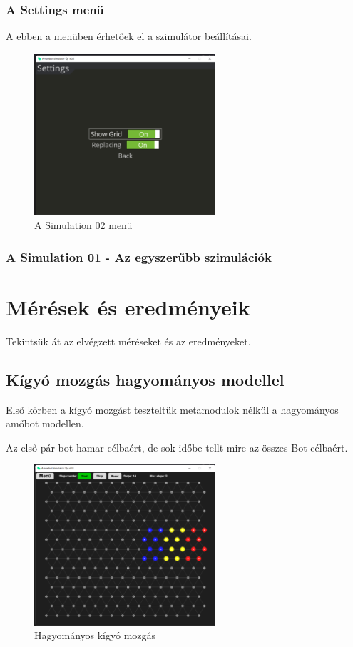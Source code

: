 \documentclass[	
  noindent
]{elteikthesis}[2024/04/26]
\begin{document}
        \subsection{A Settings menü}
        A ebben a menüben érhetőek el a szimulátor beállításai.

        \begin{figure}[H]
          \centering
          \includegraphics[width=0.6\textwidth]{images/simulatons/settings.png}
          \caption{A Simulation 02 menü}
          \label{fig:settings}
        \end{figure}

      \subsection{A Simulation 01 - Az egyszerűbb szimulációk}

\chapter{Mérések és eredményeik}
  Tekintsük át az elvégzett méréseket és az eredményeket.

  \section{Kígyó mozgás hagyományos modellel}
    Első körben a kígyó mozgást teszteltük metamodulok nélkül a hagyományos amőbot modellen.

    Az első pár bot hamar célbaért, de sok időbe tellt mire az összes Bot célbaért.

    \begin{figure}[H]
      \centering
      \includegraphics[width=0.6\textwidth]{images/mesurements/01_step_snake.png}
      \caption{Hagyományos kígyó mozgás}
      \label{fig:01_step_snake}
    \end{figure}
\end{document}
